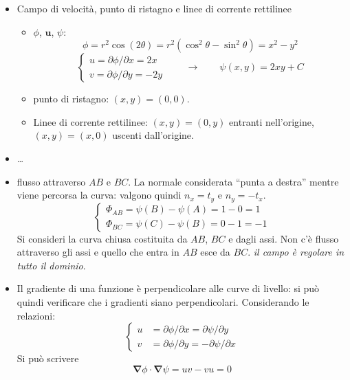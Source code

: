 \begin{itemize}
 \item Campo di velocità, punto di ristagno e linee di corrente rettilinee
    \begin{itemize}
   \item  $\phi$, $\bm{u}$, $\psi$:
   \begin{equation*}
     \phi = r^2 \cos(2\theta) = r^2 ( \cos^2 \theta - \sin^2 \theta) = 
        x^2 - y^2
   \end{equation*}
   \begin{equation*}
    \begin{cases}
      u = \partial \phi / \partial x = 2x \\
      v = \partial \phi / \partial y = -2y
    \end{cases} \qquad \rightarrow \qquad  \psi(x,y) = 2 x y + C
   \end{equation*}
   
   \item punto di ristagno: $(x,y)=(0,0)$.
   \item Linee di corrente rettilinee: $(x,y) = (0,y)$ entranti nell'origine,
     $(x,y) = (x,0)$ uscenti dall'origine.
   \end{itemize}
 
 \item \dots
 \item flusso attraverso $AB$ e $BC$. La normale considerata ``punta a destra''
   mentre viene percorsa la curva: valgono quindi $n_x = t_y$ e $n_y = -t_x$.
   \begin{equation*}
    \begin{cases}
     \Phi_{AB} = \psi(B) - \psi(A) = 1 - 0 = 1  \\
     \Phi_{BC} = \psi(C) - \psi(B) = 0 - 1 = -1
    \end{cases}
   \end{equation*}
   Si consideri la curva chiusa costituita da $AB$, $BC$ e dagli assi. Non c'è
   flusso attraverso gli assi e quello che entra in $AB$ esce da $BC$. 
   \textit{il campo è regolare in tutto il dominio}.
 \item Il gradiente di una funzione è perpendicolare alle curve di livello: si
       può quindi verificare che i gradienti siano perpendicolari. Considerando
       le relazioni:
   \begin{equation*}
    \begin{cases}
      u & = \partial \phi / \partial x = \partial \psi / \partial y \\
      v & = \partial \phi / \partial y = - \partial \psi / \partial x
    \end{cases}
   \end{equation*}
   Si può scrivere
   \begin{equation*}
     \bm{\nabla}\phi \cdot \bm{\nabla}\psi = u v - v u = 0
   \end{equation*}
\end{itemize}



